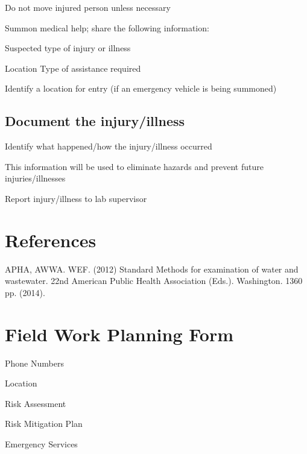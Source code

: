 \documentclass[12pt]{../SOP4_alpha}\usepackage[]{graphicx}\usepackage[]{color}
\begin{document}
\NP Do not move injured person unless necessary

\NP Summon medical help; share the following information:

\NP Suspected type of injury or illness

\NP Location
\NP Type of assistance required

\NP Identify a location for entry (if an emergency vehicle is being summoned)

\subsection{Document the injury/illness}

\NP Identify what happened/how the injury/illness occurred

\NP This information will be used to eliminate hazards and prevent future injuries/illnesses

\NP Report injury/illness to lab supervisor

\section{References}

\NP APHA, AWWA. WEF. (2012) Standard Methods for examination of water and wastewater. 22nd American Public Health Association (Eds.). Washington. 1360 pp. (2014).

\newpage
\section{Field Work Planning Form}

\NP Phone Numbers

\NP Location

\NP Risk Assessment

\NP Risk Mitigation Plan

\NP Emergency Services 
\end{document}
